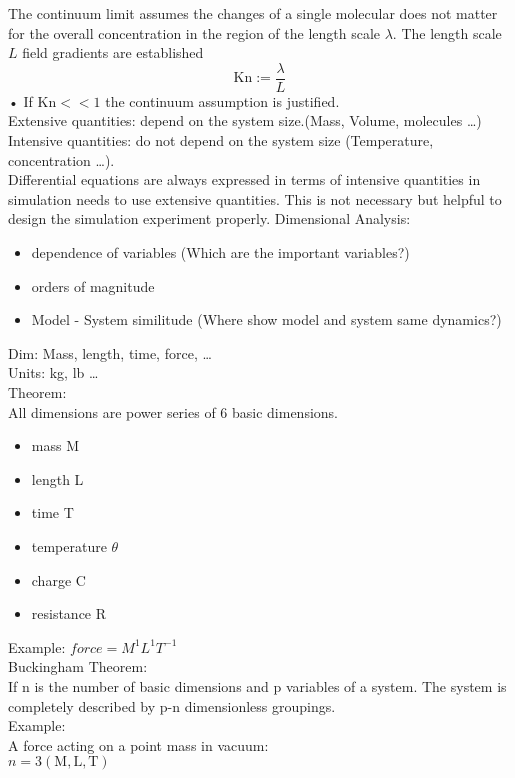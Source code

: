 \documentclass[hyperref]{labbook}
\numberwithin{equation}{experiment}
\numberwithin{table}{experiment}
\numberwithin{figure}{experiment}
\begin{document}
The continuum limit assumes the changes of a single molecular does not matter for the overall concentration in the region of the length scale  $\lambda$. 
The length scale $L$ field gradients are established  \\
\begin{equation}
\mathrm{Kn} := \frac{\lambda}{L} 
\end{equation}•
If $\mathrm{Kn} << 1 $ the continuum assumption is justified. \\[1em]
Extensive quantities: depend on the system size.(Mass, Volume, molecules \dots) \\
Intensive quantities: do not depend on the system size (Temperature, concentration \dots). \\[1em]
Differential equations are always expressed in terms of intensive quantities in simulation needs to use extensive quantities. This is not necessary but helpful to design the simulation experiment properly. \newpage
Dimensional Analysis: 
\begin{itemize}
\item dependence of variables (Which are the important variables?)
\item orders of magnitude
\item Model - System similitude (Where show model and system same dynamics?)
\end{itemize}
Dim:   Mass, length, time, force,  \dots\\
Units: kg, lb \dots \\[1em]
Theorem:\\
All dimensions are power series of 6 basic dimensions.
\begin{itemize}
\item mass M
\item length L 
\item time T 
\item temperature $\theta$
\item charge C
\item resistance R
\end{itemize}
Example: $force = M^1L^1T^{-1}$\\[1em]
Buckingham Theorem:\\
If n is the number of basic dimensions  and p variables of a system. The system is completely described by p-n dimensionless groupings. \\
Example:\\
A force acting on a point mass in vacuum: \\
$n = 3 (\mathrm{M,L,T})$\\
\end{document}
